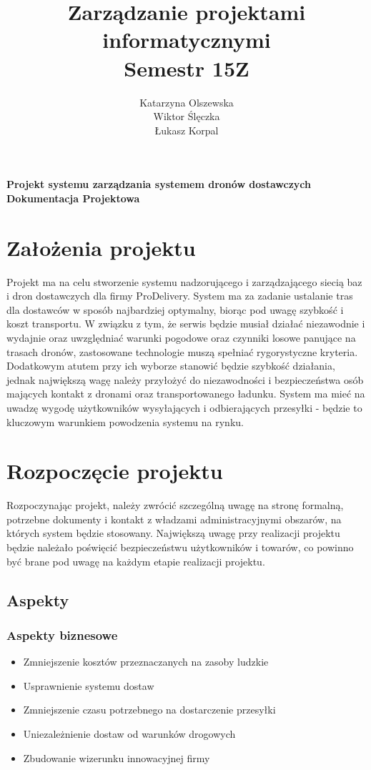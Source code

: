\documentclass[11pt]{article}
\title{\textbf{Zarządzanie projektami informatycznymi \\ Semestr 15Z}}
\author{Katarzyna Olszewska\\
		Wiktor Ślęczka\\
		Łukasz Korpal}
\date{}
\begin{document}
\maketitle

\newpage
\large{\textbf{Projekt systemu zarządzania systemem dronów dostawczych\\
Dokumentacja Projektowa}}

\section{Założenia projektu}
Projekt ma na celu stworzenie systemu nadzorującego i zarządzającego siecią baz i dron dostawczych dla firmy ProDelivery.
System ma za zadanie ustalanie tras dla dostawców w sposób najbardziej optymalny, biorąc pod uwagę szybkość i koszt transportu.
W związku z tym, że serwis będzie musiał działać niezawodnie i wydajnie oraz uwzględniać warunki pogodowe oraz czynniki losowe panujące na trasach dronów, zastosowane technologie muszą spełniać rygorystyczne kryteria.
Dodatkowym atutem przy ich wyborze stanowić będzie szybkość działania, jednak największą wagę należy przyłożyć do niezawodności i bezpieczeństwa osób mających kontakt z dronami oraz transportowanego ładunku.
System ma mieć na uwadzę wygodę użytkowników wysyłających i odbierających przesyłki - będzie to kluczowym warunkiem powodzenia systemu na rynku.


\section{Rozpoczęcie projektu}
Rozpoczynając projekt, należy zwrócić szczególną uwagę na stronę formalną, potrzebne dokumenty i kontakt z władzami administracyjnymi obszarów, na których system będzie stosowany.
Największą uwagę przy realizacji projektu będzie należało poświęcić bezpieczeństwu użytkowników i towarów, co powinno być brane pod uwagę na każdym etapie realizacji projektu.
\subsection{Aspekty}
\subsubsection{Aspekty biznesowe}
\begin{itemize}
\item Zmniejszenie kosztów przeznaczanych na zasoby ludzkie
\item Usprawnienie systemu dostaw
\item Zmniejszenie czasu potrzebnego na dostarczenie przesyłki
\item Uniezależnienie dostaw od warunków drogowych
\item Zbudowanie wizerunku innowacyjnej firmy
\end{itemize}
\end{document}
